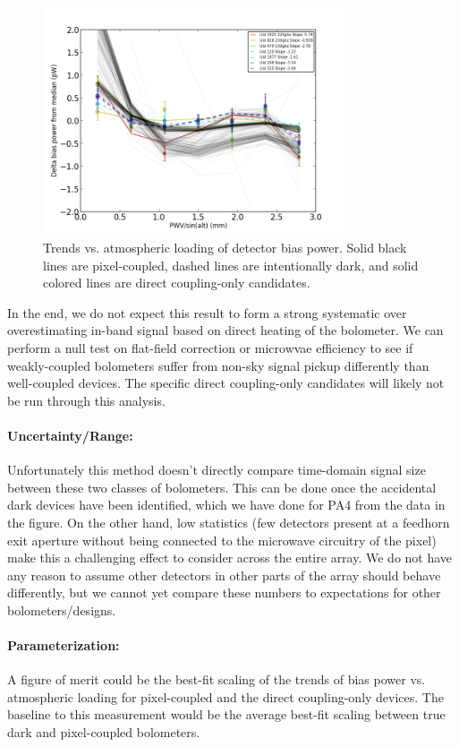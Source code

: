 \begin{figure}[h!]
\centering
\includegraphics[width=0.8\textwidth]{figures/pickup_test.png}
\caption{Trends vs. atmospheric loading of detector bias power. Solid black lines are pixel-coupled, dashed lines are intentionally dark, and solid colored lines are direct coupling-only candidates.}
\label{direct_pickup_PA4}
\end{figure}

In the end, we do not expect this result to form a strong systematic over overestimating in-band signal based on direct heating of the bolometer. We can perform a null test on flat-field correction or microwvae efficiency to see if weakly-coupled bolometers suffer from non-sky signal pickup differently than well-coupled devices. The specific direct coupling-only candidates will likely not be run through this analysis.

\paragraph{Uncertainty/Range:}
Unfortunately this method doesn't directly compare time-domain signal size between these two classes of bolometers. This can be done once the accidental dark devices have been identified, which we have done for PA4 from the data in the figure. On the other hand, low statistics (few detectors present at a feedhorn exit aperture without being connected to the microwave circuitry of the pixel) make this a challenging effect to consider across the entire array. We do not have any reason to assume other detectors in other parts of the array should behave differently, but we cannot yet compare these numbers to expectations for other bolometers/designs.

\paragraph{Parameterization:}
A figure of merit could be the best-fit scaling of the trends of bias power vs. atmospheric loading for pixel-coupled and the direct coupling-only devices. The baseline to this measurement would be the average best-fit scaling between true dark and pixel-coupled bolometers.
